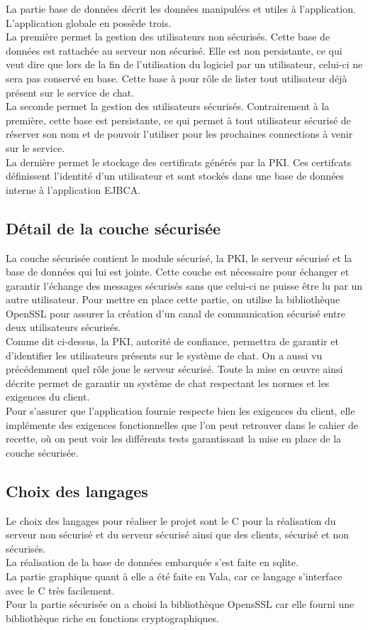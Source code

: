 \documentclass[a4paper,11pt,french]{book}
\begin{document}
La partie base de données décrit les données manipulées et utiles à l'application. L'application globale en possède trois.\\
La première permet la gestion des utilisateurs non sécurisés. Cette base de données est rattachée au serveur non sécurisé. Elle est non persistante, ce qui veut dire que lors de la fin de l'utilisation du logiciel par un utilisateur, celui-ci ne sera pas conservé en base. Cette base à pour rôle de lister tout utilisateur déjà présent sur le service de chat.\\
La seconde permet la gestion des utilisateurs sécurisés. Contrairement à la première, cette base est persistante, ce qui permet à tout utilisateur sécurisé de réserver son nom et de pouvoir l'utiliser pour les prochaines connections à venir sur le service.\\ La dernière permet le stockage des certificats générés par la PKI. Ces certifcats définissent l'identité d'un utilisateur et sont stockés dans une base de données interne à l'application EJBCA.

\subsection{Détail de la couche sécurisée}
La couche sécurisée contient le module sécurisé, la PKI, le serveur sécurisé et la base de données qui lui est jointe. Cette couche est nécessaire pour échanger et garantir l'échange des messages sécurisés sans que celui-ci ne puisse être lu par un autre utilisateur. Pour mettre en place cette partie, on utilise la bibliothèque OpenSSL pour assurer la création d'un canal de communication sécurisé entre deux utilisateurs sécurisés.\\Comme dit ci-dessus, la PKI, autorité de confiance, permettra de garantir et d'identifier les utilisateurs présents sur le système de chat. On a aussi vu précédemment quel rôle joue le serveur sécurisé. Toute la mise en \oe uvre ainsi décrite permet de garantir un système de chat respectant les normes et les exigences du client. \\

Pour s'assurer que l'application fournie respecte bien les exigences du client, elle implémente des exigences fonctionnelles que l'on peut retrouver dans le {cahier de recette}, où on peut voir les différents tests garantissant la mise en place de la couche sécurisée.

\subsection{Choix des langages}
Le choix des langages pour réaliser le projet sont le C pour la réalisation du serveur non sécurisé et du serveur sécurisé ainsi que des clients, sécurisé et non sécurisés.\\La réalisation de la base de données embarquée s'est faite en sqlite.\\La partie graphique quant à elle a été faite en Vala, car ce langage s'interface avec le C très facilement.\\
Pour la partie sécurisée on a choisi la bibliothèque OpensSSL car elle fourni une bibliothèque riche en fonctions cryptographiques.
\end{document}

